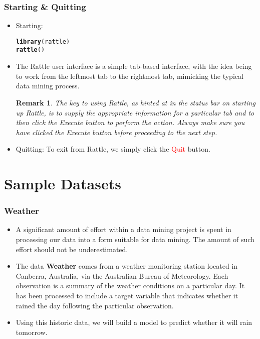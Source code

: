 \documentclass{beamer}\usepackage[]{graphicx}\usepackage[]{color}
\makeatletter
\newcommand{\hlstd}[1]{\textcolor[rgb]{0.345,0.345,0.345}{#1}}%
\newcommand{\hlkwd}[1]{\textcolor[rgb]{0.737,0.353,0.396}{\textbf{#1}}}%
\newenvironment{kframe}{%
 \def\at@end@of@kframe{}%
 \ifinner\ifhmode%
  \def\at@end@of@kframe{\end{minipage}}%
  \begin{minipage}{\columnwidth}%
 \fi\fi%
 \def\FrameCommand##1{\hskip\@totalleftmargin \hskip-\fboxsep
 \colorbox{shadecolor}{##1}\hskip-\fboxsep
     \hskip-\linewidth \hskip-\@totalleftmargin \hskip\columnwidth}%
 \MakeFramed {\advance\hsize-\width
   \@totalleftmargin\z@ \linewidth\hsize
   \@setminipage}}%
 {\par\unskip\endMakeFramed%
 \at@end@of@kframe}
\newenvironment{knitrout}{}{} %
\newtheorem{mythr}{\color{red} Remark}[section]
\makeatother
\begin{document}
\begin{frame}[fragile]
\frametitle{Starting \& Quitting}
\begin{itemize}
\item Starting:
\begin{knitrout}
\color{fgcolor}\begin{kframe}
\begin{alltt}
\hlkwd{library}\hlstd{(rattle)}
\hlkwd{rattle}\hlstd{()}
\end{alltt}
\end{kframe}
\end{knitrout}
\item The Rattle user interface is a simple tab-based interface, with the idea being to work from the leftmost tab to the rightmost tab, mimicking the typical data mining process.
\begin{mythr}
The key to using Rattle, as hinted at in the status bar on starting up Rattle, is to supply the appropriate information for a particular tab and to then click the Execute button to perform the action. Always make sure you have clicked the Execute button before proceeding to the next step.
\end{mythr}
\item Quitting: To exit from Rattle, we simply click the \textcolor{red}{Quit} button.
\end{itemize}
\end{frame}

\section{Sample Datasets}
\begin{frame}
\frametitle{Weather}
\begin{itemize}
\item A significant amount of effort within a data mining project is spent in processing our data into a form suitable for data mining. The amount of such effort should not be underestimated.
\item The data \textbf{Weather} comes from a weather monitoring station located in Canberra, Australia, via the Australian Bureau of Meteorology. Each observation is a summary of the weather conditions on a particular day. It has been processed to include a target variable that indicates whether it rained the day following the particular observation.
\item Using this historic data, we will build a model to predict whether it will rain tomorrow.
\end{itemize}
\end{frame}
\end{document}
